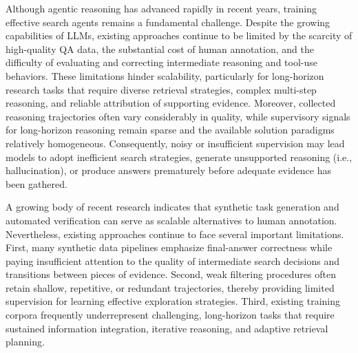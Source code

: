 \documentclass{huawei}
\begin{document}
Although agentic reasoning \cite{singh2025agentic, wu2025agentic, wu2025agentic1} has advanced rapidly in recent years, training effective search agents \cite{team2026mirothinker, chu2026redsearcher, jin2025search, song2025r1, yu2026m, mei2025ai, xia2026search, gong2024cosearchagent, chen2026unitymas, yang2026tournament, zhang2026oases, chen2025mao, chen2026beyond, chen2026jade, chen2026improving} remains a fundamental challenge. Despite the growing capabilities of LLMs, existing approaches continue to be limited by the scarcity of high-quality QA data, the substantial cost of human annotation, and the difficulty of evaluating and correcting intermediate reasoning and tool-use behaviors.
These limitations hinder scalability, particularly for long-horizon research tasks that require diverse retrieval strategies, complex multi-step reasoning, and reliable attribution of supporting evidence.
Moreover, collected reasoning trajectories often vary considerably in quality, while supervisory signals for long-horizon reasoning remain sparse and the available solution paradigms relatively homogeneous. Consequently, noisy or insufficient supervision may lead models to adopt inefficient search strategies, generate unsupported reasoning (i.e., hallucination), or produce answers prematurely before adequate evidence has been gathered.


A growing body of recent research \cite{team2026mirothinker, chu2026redsearcher, deng2026fort, du2026openseeker, zhu2026marco, hu2025step} indicates that synthetic task generation and automated verification can serve as scalable alternatives to human annotation. 
Nevertheless, existing approaches continue to face several important limitations. 
First, many synthetic data pipelines emphasize final-answer correctness while paying insufficient attention to the quality of intermediate search decisions and transitions between pieces of evidence.
Second, weak filtering procedures often retain shallow, repetitive, or redundant trajectories, thereby providing limited supervision for learning effective exploration strategies.
Third, existing training corpora frequently underrepresent challenging, long-horizon tasks that require sustained information integration, iterative reasoning, and adaptive retrieval planning.
\end{document}
